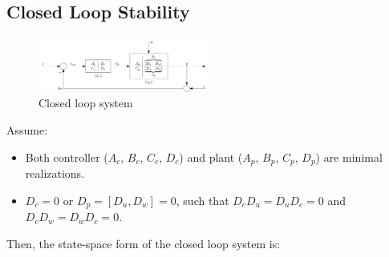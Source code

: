 \documentclass[letterpaper,12pt]{article}
\begin{document}
\subsection{Closed Loop Stability}
\begin{figure}[h]
    \centering
    \includegraphics[width=0.5\textwidth]{closed loop diagram.png}
    \caption{Closed loop system}
\end{figure}
Assume:
\begin{itemize}
    \item Both controller ($A_c$, $B_c$, $C_c$, $D_c$) and plant ($A_p$, $B_p$, $C_p$, $D_p$) are minimal realizations.
    \item $D_c= 0$ or $D_p = [D_u, D_w] = 0$, such that $D_c D_u = D_u D_c = 0$ and $D_c D_w = D_w D_c = 0$.
\end{itemize}
Then, the state-space form of the closed loop system is:
\end{document}
